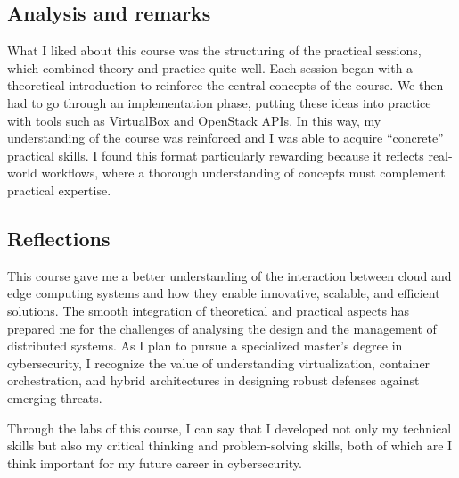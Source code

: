 \subsection{Analysis and remarks}
\indent \indent What I liked about this course was the structuring of the practical sessions, which combined theory and practice quite well. Each session began with a theoretical introduction to reinforce the central concepts of the course. We then had to go through an implementation phase, putting these ideas into practice with tools such as VirtualBox and OpenStack APIs. In this way, my understanding of the course was reinforced and I was able to acquire “concrete” practical skills. I found this format particularly rewarding because it reflects real-world workflows, where a thorough understanding of concepts must complement practical expertise.

\subsection{Reflections}
\indent \indent This course gave me a better understanding of the interaction between cloud and edge computing systems and how they enable innovative, scalable, and efficient solutions. The smooth integration of theoretical and practical aspects has prepared me for the challenges of analysing the design and the management of distributed systems. As I plan to pursue a specialized master's degree in cybersecurity, I recognize the value of understanding virtualization, container orchestration, and hybrid architectures in designing robust defenses against emerging threats.
\vspace{0.25cm}

\noindent Through the labs of this course, I can say that I developed not only my technical skills but also my critical thinking and problem-solving skills, both of which are I think important for my future career in cybersecurity.